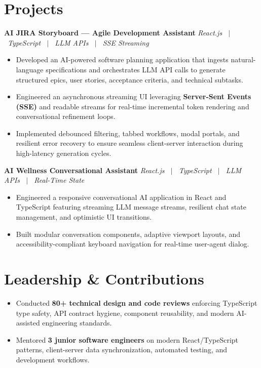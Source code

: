 \documentclass[letterpaper,10pt]{article}
\newcommand{\resumeProject}[2]{%
  \vspace{2pt}%
  \textbf{#1} \hfill \textit{#2}\\[-6pt]
}
\begin{document}

\section{Projects}

\resumeProject
  {AI JIRA Storyboard --- Agile Development Assistant}{React.js \ $|$ \ TypeScript \ $|$ \ LLM APIs \ $|$ \ SSE Streaming}
\begin{itemize}
  \item Developed an AI-powered software planning application that ingests natural-language specifications and orchestrates LLM API calls to generate structured epics, user stories, acceptance criteria, and technical subtasks.
  \item Engineered an asynchronous streaming UI leveraging \textbf{Server-Sent Events (SSE)} and readable streams for real-time incremental token rendering and conversational refinement loops.
  \item Implemented debounced filtering, tabbed workflows, modal portals, and resilient error recovery to ensure seamless client-server interaction during high-latency generation cycles.
\end{itemize}

\resumeProject
  {AI Wellness Conversational Assistant}{React.js \ $|$ \ TypeScript \ $|$ \ LLM APIs \ $|$ \ Real-Time State}
\begin{itemize}
  \item Engineered a responsive conversational AI application in React and TypeScript featuring streaming LLM message streams, resilient chat state management, and optimistic UI transitions.
  \item Built modular conversation components, adaptive viewport layouts, and accessibility-compliant keyboard navigation for real-time user-agent dialog.
\end{itemize}


\section{Leadership \& Contributions}

\begin{itemize}
  \item Conducted \textbf{80+ technical design and code reviews} enforcing TypeScript type safety, API contract hygiene, component reusability, and modern AI-assisted engineering standards.
  \item Mentored \textbf{3 junior software engineers} on modern React/TypeScript patterns, client-server data synchronization, automated testing, and development workflows.
\end{itemize}
\end{document}
